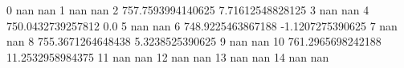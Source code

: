 0 nan nan
1 nan nan
2 757.7593994140625 7.71612548828125
3 nan nan
4 750.0432739257812 0.0
5 nan nan
6 748.9225463867188 -1.1207275390625
7 nan nan
8 755.3671264648438 5.3238525390625
9 nan nan
10 761.2965698242188 11.2532958984375
11 nan nan
12 nan nan
13 nan nan
14 nan nan
